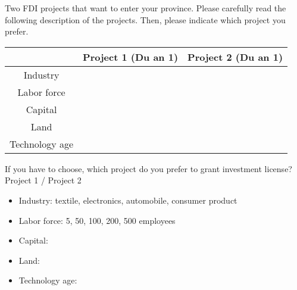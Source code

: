 Two FDI projects that want to enter your province. Please carefully read the following description of the projects. Then, please indicate which project you prefer.

\begin{center}
  \begin{tabular}{ c | c | c }
    \hline
     & Project 1 (Du an 1) & Project 2 (Du an 1) \\ \hline
    Industry &  &  \\ \hline
    Labor force &  &  \\ \hline
    Capital &  &  \\ \hline
    Land &  &  \\ \hline
    Technology age &  &  \\ \hline
    \hline
  \end{tabular}
\end{center}

If you have to choose, which project do you prefer to grant investment license? Project 1 / Project 2

\begin{itemize}
\item Industry: textile, electronics, automobile, consumer product
\item Labor force: 5, 50, 100, 200, 500 employees
\item Capital:
\item Land:
\item Technology age: 
\end{itemize}